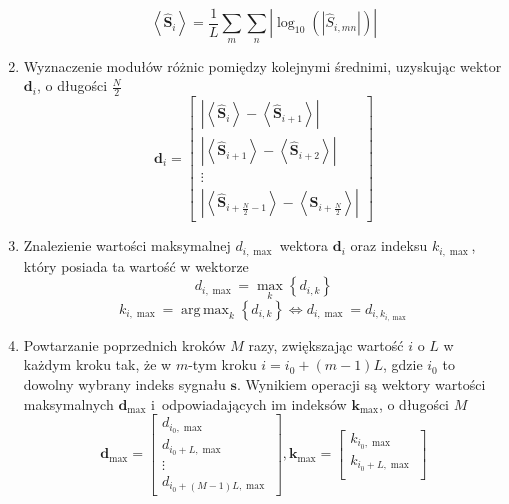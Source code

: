\documentclass[pl,12pt]{aghdpl}
\DeclareMathOperator*{\argmax}{arg\,max}
\begin{document}
\begin{enumerate}
\begin{equation}
      \left<\hat{\bm S}_i\right> =
      \frac{1}{L}\sum_m\sum_n\left|\log_{10}
      \left(\left|\hat{S}_{i, mn}\right|\right)\right|
    \end{equation}
  \item Wyznaczenie modułów różnic pomiędzy kolejnymi średnimi, uzyskując
    wektor $\bm d_i$, o długości $\frac{N}{2}$
    \begin{equation}
      \bm d_i = \begin{bmatrix}
        \left|\left<\hat{\bm S}_i\right> -
        \left<\hat{\bm S}_{i+1}\right>\right|\\
        \left|\left<\hat{\bm S}_{i+1}\right> -
        \left<\hat{\bm S}_{i+2}\right>\right|\\
        \vdots\\
        \left|\left<\hat{\bm S}_{i+\frac{N}{2}-1}\right> -
        \left<\hat{\bm S}_{i+\frac{N}{2}}\right>\right|
      \end{bmatrix}
    \end{equation}
    \item Znalezienie wartości maksymalnej $d_{i,\max}$ wektora $\bm d_i$ oraz
      indeksu $k_{i,\max}$, który posiada ta wartość w wektorze
      \begin{equation}
        d_{i,\max} = \max_k\left\{d_{i, k}\right\}
      \end{equation}
      \begin{equation}
        k_{i,\max} = \argmax_k\left\{d_{i,k}\right\} \iff d_{i,\max} =
        d_{i,k_{i,\max}}
      \end{equation}
    \item Powtarzanie poprzednich kroków $M$ razy, zwiększając wartość $i$ o $L$
      w każdym kroku tak, że w $m$-tym kroku $i = i_0 + (m-1)L$, gdzie $i_0$ to
      dowolny wybrany indeks sygnału $\bm s$. Wynikiem operacji są wektory
      wartości maksymalnych $\bm d_{\max}$ i~odpowiadających im indeksów $\bm
      k_{\max}$, o długości $M$
      \begin{equation}
        \bm d_{\max} = \begin{bmatrix}
          d_{i_0,\max}\\
          d_{i_0+L,\max}\\
          \vdots\\
          d_{i_0+(M-1)L,\max}
        \end{bmatrix},
        \bm k_{\max} = \begin{bmatrix}
          k_{i_0,\max}\\
          k_{i_0+L,\max}\\

\end{bmatrix}
\end{equation}
\end{enumerate}
\end{document}
